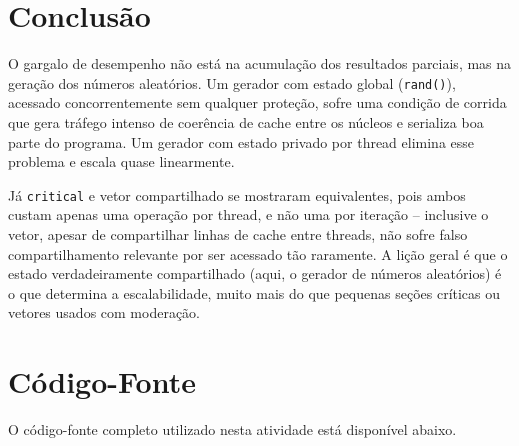 \documentclass[a4paper,12pt]{article}
\begin{document}
\section{Conclusão}

O gargalo de desempenho não está na acumulação dos resultados parciais, mas na
geração dos números aleatórios. Um gerador com estado global (\texttt{rand()}),
acessado concorrentemente sem qualquer proteção, sofre uma condição de corrida
que gera tráfego intenso de coerência de cache entre os núcleos e serializa
boa parte do programa. Um gerador com estado privado por thread elimina
esse problema e escala quase linearmente. 

Já \texttt{critical} e vetor
compartilhado se mostraram equivalentes, pois ambos custam apenas uma operação
por thread, e não uma por iteração -- inclusive o vetor, apesar de
compartilhar linhas de cache entre threads, não sofre falso compartilhamento
relevante por ser acessado tão raramente. A lição geral é que o estado
verdadeiramente compartilhado (aqui, o gerador de números aleatórios) é o que
determina a escalabilidade, muito mais do que pequenas seções críticas ou
vetores usados com moderação.

\newpage
\appendix

\section{Código-Fonte}
\label{sec:codigo}

O código-fonte completo utilizado nesta atividade está disponível abaixo.


\end{document}
